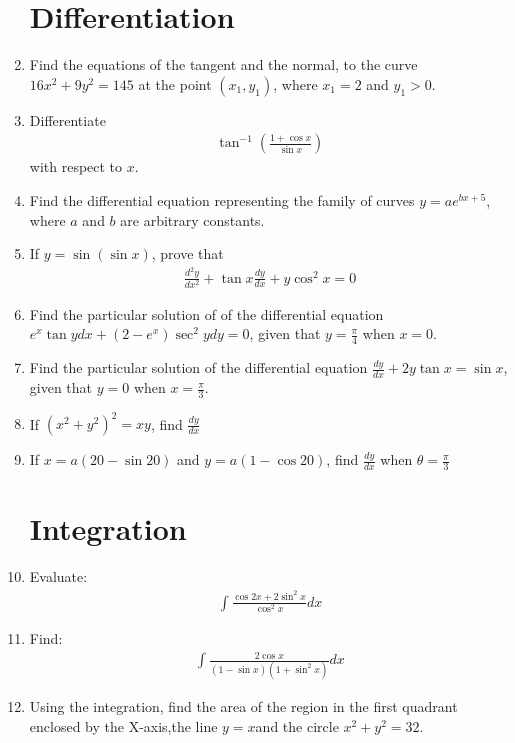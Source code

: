 \documentclass[10pt,-letter paper]{article}
\providecommand{\brak}[1]{\ensuremath{\left(#1\right)}}
\begin{document}
\begin{enumerate}
   \section{Differentiation}
 \item Find the equations of the tangent and the normal, to the curve $16x^{2}+9y^{2}=145$ at the point $\brak{x_1,y_1}$, where $x_1=2$ and $y_1>0$.
 \item Differentiate 
  \begin{align*}
   \tan^{-1}\brak{\frac{1+\cos x}{\sin x}} 
  \end{align*} 
    with respect to $x$.
  

\item Find the differential equation representing the family of curves $y=ae^{bx+5}$, where $a$ and $b$ are arbitrary constants.

\item If $y=\sin\brak{\sin x}$, prove that 
    \begin{align*}
      \frac{d^{2}y}{dx^{2}}+\tan x \frac{dy}{dx}+y\cos^{2}x=0
    \end{align*}
  \item Find the particular solution of of the differential equation $e^{x}\tan y dx +\brak{2-e^{x}}\sec^{2} y dy=0$, given that $y=\frac{\pi}{4}$ when $x=0$. 
  \item Find the particular solution of the differential equation  $\frac{dy}{dx}+2y\tan x =\sin x$, given that $y=0$ when $x=\frac{\pi}{3}$.
 
 \item If ${\brak{x^{2}+y^{2}}}^{2}=xy$, find $\frac{dy}{dx}$

\item If $x=a\brak{20-\sin 20}$ and $y=a\brak{1-\cos 20}$, find $\frac{dy}{dx}$ when $\theta=\frac{\pi}{3}$

\section{Integration}

\item Evaluate:
      \begin{align*}
      \int\frac{\cos 2x+2\sin^{2}x}{\cos^{2}x}dx
        \end{align*}
\item Find:
  \begin{align*}
    \int\frac{2\cos x}{\brak{1-\sin x}\brak{1+\sin^{2}x}}dx
  \end{align*}
 \item Using the integration, find the area of the region in the first quadrant enclosed by the X-axis,the line $y=x$and the circle $x^{2}+y^{2}=32$.


\end{enumerate}
\end{document}
